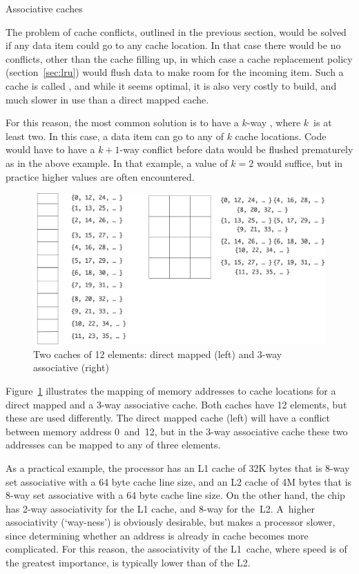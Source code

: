  {Associative caches}
\label{sec:associative}

The problem of cache conflicts, outlined in the previous section, would
be solved if any data item could go to any cache location. In that
case there would be no conflicts, other than the cache filling up, in
which case a cache replacement policy (section~\ref{sec:lru}) would
flush data to make room for the incoming item. Such a cache is called
, and while it seems optimal, it is also
very costly to build, and much slower in use than a direct mapped cache.

For this reason, the most common solution is to have a
$k$-way , where $k$~is at least two. In
this case, a data item can go to any of $k$ cache locations. Code
would have to have a $k+1$-way conflict before data would be flushed
prematurely as in the above example. In that example, a value of $k=2$
would suffice, but in practice higher values are often encountered.
\begin{figure}[ht]
\includegraphics[scale=.12]{graphics/assoc-mapping}
\caption{Two caches of 12 elements: direct mapped (left) and 3-way associative (right)}
\label{fig:assoc-mapping}
\end{figure}
Figure~\ref{fig:assoc-mapping} illustrates the mapping of memory
addresses to cache locations for a direct mapped and a 3-way associative
cache. Both caches have 12 elements, but these are used differently.
The direct mapped cache (left)
will have a conflict between memory address 0~and~12, but
in the 3-way associative cache these two addresses can be mapped
to any of three elements.

As a practical example, the
 processor has
an L1 cache of 32K bytes that is 8-way set associative with a 64
  byte cache line size, and
an L2 cache of 4M bytes that is 8-way set associative with a 64
  byte cache line size.
On the other hand, the  chip
has 2-way associativity for the L1 cache, and 8-way for
the~L2. A~higher associativity (`way-ness') is obviously desirable,
but makes a processor slower, since determining whether an address is
already in cache becomes more complicated. For this reason, the
associativity of the L1~cache, where speed is of the greatest
importance, is typically lower than of the L2.

